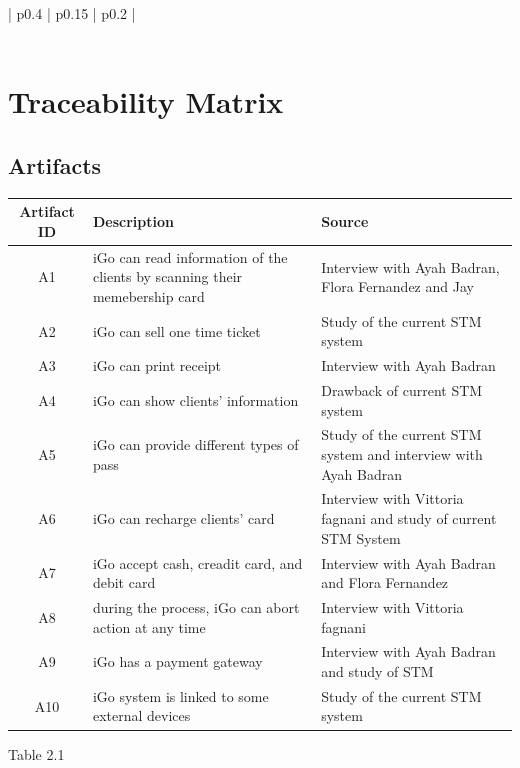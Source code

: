 \documentclass[12pt]{report}
\begin{document}
\begin{longtable}{!{\color{blue}\vrule width 5pt} p{0.4\linewidth} | p{0.15\linewidth} | p{0.2\linewidth} !{\color{blue}\vrule width 5pt} }
	 \\
	
	
	 \\ %
	
	\hline
	
	
	\noalign{\global\arrayrulewidth=1mm}
	\hline
	\noalign{\global\arrayrulewidth=0.5mm}
	\hline	
	
\end{longtable}







\chapter{Traceability Matrix}
\section{Artifacts}
\begin{tabular}{|c|p{9cm}<{\centering}|p{6cm}<{\centering}|}
\hline
\textbf{Artifact ID}&\textbf{Description}&\textbf{Source} \\
\hline
A1
&iGo can read information of the clients by scanning their memebership card
&Interview with Ayah Badran, Flora Fernandez and Jay\\
\hline
A2
&iGo can sell one time ticket
&Study of the current STM system
\\
\hline
A3
&iGo can print receipt
&Interview with Ayah Badran
\\
\hline
A4
&iGo can show clients' information
&Drawback of current STM system
\\
\hline
A5
&iGo can provide different types of pass
&Study of the current STM system and interview with Ayah Badran
\\
\hline
A6
&iGo can recharge clients' card
&Interview with Vittoria fagnani and study of current STM System
\\
\hline
A7
&iGo accept cash, creadit card, and debit card
&Interview with Ayah Badran and Flora Fernandez
\\
\hline
A8
&during the process, iGo can abort action at any time
&Interview with Vittoria fagnani
\\
\hline
A9
&iGo has a payment gateway
&Interview with Ayah Badran and study of STM
\\
\hline
A10
&iGo system is linked to some external devices
&Study of the current STM system 
\\
\hline
\end{tabular}
\begin{center}
Table 2.1
\end{center}
\end{document}
